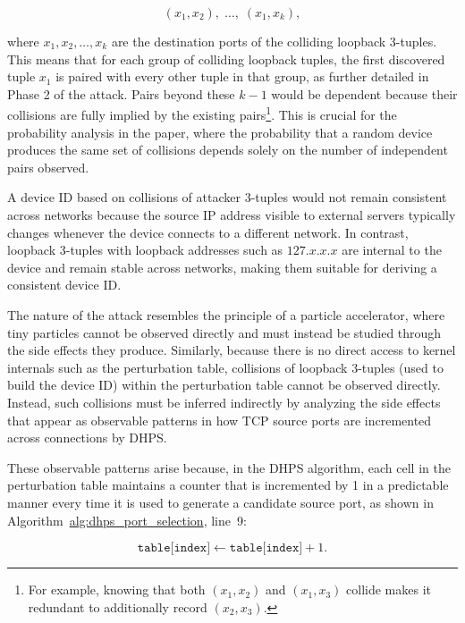 \documentclass[twocolumn]{report}
\begin{document}
\vspace{-0.2cm}
\begin{minipage}{\columnwidth}
\[
	(x_1, x_2),\; \ldots,\; (x_1, x_k),
\]
\end{minipage}

where $x_1, x_2, \ldots, x_k$ are the destination ports of the colliding loopback 3-tuples. This means that for each group of colliding loopback tuples, the first discovered tuple $x_1$ is paired with every other tuple in that group, as further detailed in Phase 2 of the attack. Pairs beyond these $k-1$ would be \alert{dependent} because their collisions are fully implied by the existing pairs\footnote{For example, knowing that both $(x_1, x_2)$ and $(x_1, x_3)$ collide makes it redundant to additionally record $(x_2, x_3)$.}. This is crucial for the probability analysis in the paper, where the probability that a random device produces the same set of collisions depends solely on the number of independent pairs observed.

A device ID based on collisions of \alert{attacker 3-tuples} would not remain consistent across networks because the source IP address visible to external servers typically changes whenever the device connects to a different network. In contrast, \alert{loopback 3-tuples} with loopback addresses such as $127.x.x.x$ are internal to the device and remain stable across networks, making them suitable for deriving a consistent device ID.

The nature of the attack resembles the principle of a \alert{particle accelerator}, where tiny particles cannot be observed directly and must instead be studied through the side effects they produce. Similarly, because there is no direct access to kernel internals such as the perturbation table, collisions of loopback 3-tuples (used to build the device ID) within the perturbation table \alert{cannot be observed directly}. Instead, such collisions must be inferred indirectly by analyzing the side effects that appear as observable patterns in how TCP source ports are incremented across connections by DHPS.

These observable patterns arise because, in the DHPS algorithm, each cell in the perturbation table maintains a counter that is incremented by 1 in a predictable manner every time it is used to generate a candidate source port, as shown in Algorithm~\hyperref[1]{alg:dhps_port_selection}, line~9:

\begin{minipage}{\columnwidth}
\[
	\texttt{table[index]} \leftarrow \texttt{table[index]} + 1.
\]
\end{minipage}
\end{document}
